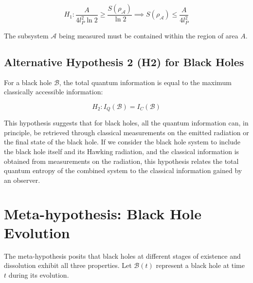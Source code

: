 	\begin{equation*}
		H_1: \frac{A}{4 l_P^2 \ln 2} \ge \frac{S(\rho_{\mathcal{A}})}{\ln 2} \implies S(\rho_{\mathcal{A}}) \le \frac{A}{4 l_P^2}
	\end{equation*}
	
	The subsystem $\mathcal{A}$ being measured must be contained within the region of area $A$.
	
	\subsection{Alternative Hypothesis 2 (H2) for Black Holes}
	
	For a black hole $\mathcal{B}$, the total quantum information is equal to the maximum classically accessible information:
	
	\begin{equation*}
		H_2: I_Q(\mathcal{B}) = I_C(\mathcal{B})
	\end{equation*}
	
	This hypothesis suggests that for black holes, all the quantum information can, in principle, be retrieved through classical measurements on the emitted radiation or the final state of the black hole. If we consider the black hole system to include the black hole itself and its Hawking radiation, and the classical information is obtained from measurements on the radiation, this hypothesis relates the total quantum entropy of the combined system to the classical information gained by an observer.
	
	\section{Meta-hypothesis: Black Hole Evolution}
	
	The meta-hypothesis posits that black holes at different stages of existence and dissolution exhibit all three properties. Let $\mathcal{B}(t)$ represent a black hole at time $t$ during its evolution.
	

